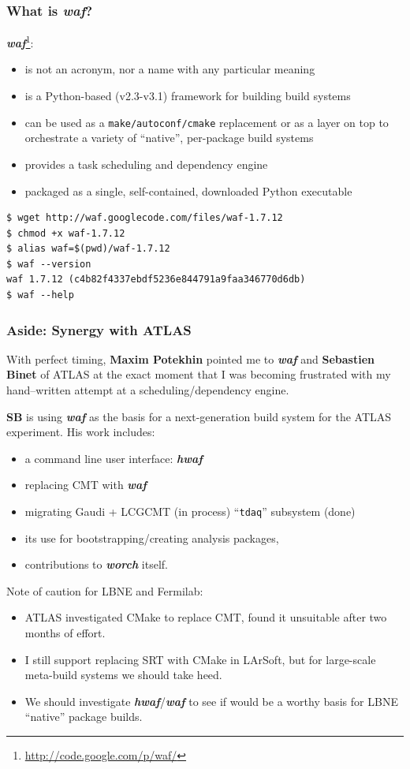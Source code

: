 \documentclass[xcolor=dvipsnames]{beamer}
\newcommand{\app}[1]{\textbf{\textit{#1}}\xspace}
\def\waf{\app{waf}}
\def\hwaf{\app{hwaf}}
\def\worch{\app{worch}}
\begin{document}
\begin{frame}[fragile]
  \frametitle{What is \waf?}

  \waf\footnote{\url{http://code.google.com/p/waf/}}:
  \begin{itemize}
  \item is not an acronym, nor a name with any particular meaning
  \item is a Python-based (v2.3-v3.1) framework for building build systems
  \item can be used as a \texttt{make/autoconf/cmake} replacement or as a layer
    on top to orchestrate a variety of ``native'', per-package build systems
  \item provides a task scheduling and dependency engine
  \item packaged as a single, self-contained, downloaded Python executable
  \end{itemize}
\begin{verbatim}
$ wget http://waf.googlecode.com/files/waf-1.7.12
$ chmod +x waf-1.7.12
$ alias waf=$(pwd)/waf-1.7.12
$ waf --version
waf 1.7.12 (c4b82f4337ebdf5236e844791a9faa346770d6db)
$ waf --help
\end{verbatim}

\end{frame}

\begin{frame}
  \frametitle{Aside: Synergy with ATLAS}
  
  With perfect timing, \textbf{Maxim Potekhin} pointed me to \waf and \textbf{Sebastien Binet} of
  ATLAS at the exact moment that I was becoming frustrated with my
  hand--written attempt at a scheduling/dependency engine.
  
  \textbf{SB} is using \waf as the basis for a next-generation build system for the ATLAS experiment.  His work includes: 
  \begin{itemize}
  \item a command line user interface: \hwaf
  \item replacing CMT with \waf
  \item migrating Gaudi + LCGCMT (in process) ``\texttt{tdaq}'' subsystem (done)
  \item its use for bootstrapping/creating analysis packages,
  \item contributions to \worch itself.
  \end{itemize}

  \vspace{2mm}
  \footnotesize
  Note of caution for LBNE and Fermilab: 
  \begin{itemize}
  \item ATLAS investigated CMake to replace CMT, found it unsuitable
    after two months of effort.
  \item 
    I still support replacing SRT with CMake in LArSoft, but for
    large-scale meta-build systems we should take heed.
  \item 
    We should investigate \hwaf/\waf to see if would be a worthy basis
    for LBNE ``native'' package builds.
  \end{itemize}
\end{frame}
\end{document}
